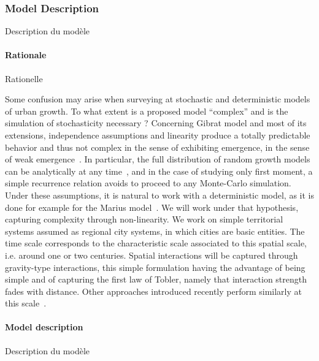 \subsubsection{Model Description}{Description du modèle}




\paragraph{Rationale}{Rationelle}


Some confusion may arise when surveying at stochastic and deterministic models of urban growth. To what extent is a proposed model ``complex'' and is the simulation of stochasticity necessary ? Concerning Gibrat model and most of its extensions, independence assumptions and linearity produce a totally predictable behavior and thus not complex in the sense of exhibiting emergence, in the sense of weak emergence~\citep{bedau2002downward}. In particular, the full distribution of random growth models can be analytically at any time~\citep{gabaix1999zipf}, and in the case of studying only first moment, a simple recurrence relation avoids to proceed to any Monte-Carlo simulation. Under these assumptions, it is natural to work with a deterministic model, as it is done for example for the Marius model~\citep{cottineau2014evolution}. We will work under that hypothesis, capturing complexity through non-linearity. We work on simple territorial systems assumed as regional city systems, in which cities are basic entities. The time scale corresponds to the characteristic scale associated to this spatial scale, i.e. around one or two centuries. Spatial interactions will be captured through gravity-type interactions, this simple formulation having the advantage of being simple and of capturing the first law of Tobler, namely that interaction strength fades with distance. Other approaches introduced recently perform similarly at this scale~\citep{masucci2013gravity}.


\paragraph{Model description}{Description du modèle}

